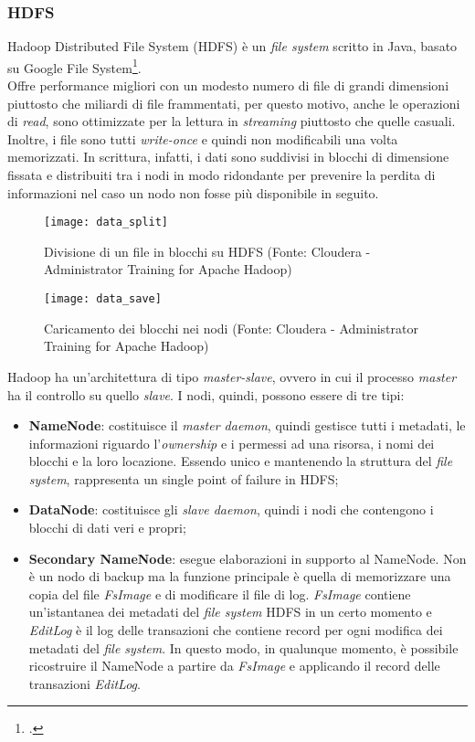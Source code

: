 \subsubsection{HDFS}
Hadoop Distributed File System (HDFS) è un \textit{file system} scritto in Java, basato su Google File System\footcite{https://ai.google/research/pubs/pub51}. \\
Offre performance migliori con un modesto numero di file di grandi dimensioni piuttosto che miliardi di file frammentati, per questo motivo, anche le operazioni di \textit{read}, sono ottimizzate per la lettura in \textit{streaming} piuttosto che quelle casuali. Inoltre, i file sono tutti \textit{write-once} e quindi non modificabili una volta memorizzati.
In scrittura, infatti, i dati sono suddivisi in blocchi di dimensione fissata e distribuiti tra i nodi in modo ridondante per prevenire la perdita di informazioni nel caso un nodo non fosse più disponibile in seguito.
\begin{figure}[!h]
	\centering
	\texttt{[image: data\_split]}
	\caption{Divisione di un file in blocchi su HDFS (Fonte: Cloudera - Administrator Training for Apache Hadoop)}
\end{figure}
\clearpage
\begin{figure}[!h]
	\centering
	\texttt{[image: data\_save]}
	\caption{Caricamento dei blocchi nei nodi (Fonte: Cloudera - Administrator Training for Apache Hadoop)}
\end{figure}
Hadoop ha un'architettura di tipo \textit{master-slave}, ovvero in cui il processo \textit{master} ha il controllo su quello \textit{slave}. I nodi, quindi, possono essere di tre tipi:
\begin{itemize}
	\item \textbf{NameNode}: costituisce il \textit{master \gls{daemon}}, quindi gestisce tutti i metadati, le informazioni riguardo l'\textit{ownership} e i permessi ad una risorsa, i nomi dei blocchi e la loro locazione. Essendo unico e mantenendo la struttura del \textit{file system}, rappresenta un \gls{single point of failure} in \gls{HDFS};
	\item \textbf{DataNode}: costituisce gli \textit{slave \gls{daemon}}, quindi i nodi che contengono i blocchi di dati veri e propri;
	\item \textbf{Secondary NameNode}: esegue elaborazioni in supporto al NameNode. Non è un nodo di backup ma la funzione principale è quella di memorizzare una copia del file \textit{FsImage} e di modificare il file di log. \textit{FsImage} contiene un'istantanea dei metadati del \textit{file system} HDFS in un certo momento e \textit{EditLog} è il log delle transazioni che contiene record per ogni modifica dei metadati del \textit{file system}. In questo modo, in qualunque momento, è possibile ricostruire il NameNode a partire da \textit{FsImage} e applicando il record delle transazioni \textit{EditLog}.
\end{itemize}
